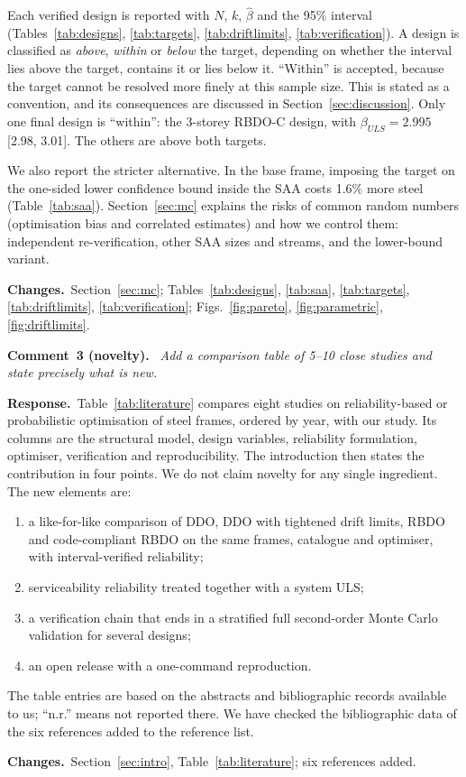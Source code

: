 \documentclass[11pt]{article}
\newcounter{rc}
\newenvironment{comment}[1]{\refstepcounter{rc}\par\medskip\noindent\textbf{Comment~#1.}\ \itshape}{\par}
\newcommand{\resp}{\par\noindent\textbf{Response.}\ }
\newcommand{\chg}{\par\noindent\textbf{Changes.}\ }
\begin{document}
Each verified design is reported with $N$, $k$, $\hat\beta$ and the 95\% interval
(Tables~\ref{tab:designs}, \ref{tab:targets}, \ref{tab:driftlimits}, \ref{tab:verification}). A design is
classified as \emph{above}, \emph{within} or \emph{below} the target, depending on whether the interval
lies above the target, contains it or lies below it. ``Within'' is accepted, because the target cannot
be resolved more finely at this sample size. This is stated as a convention, and its consequences are
discussed in Section~\ref{sec:discussion}. Only one final design is ``within'': the 3-storey RBDO-C
design, with $\beta_{ULS}=2.995$ [2.98, 3.01]. The others are above both targets.

We also report the stricter alternative. In the base frame, imposing the target on the one-sided lower
confidence bound inside the SAA costs 1.6\% more steel (Table~\ref{tab:saa}). Section~\ref{sec:mc}
explains the risks of common random numbers (optimisation bias and correlated estimates) and how we
control them: independent re-verification, other SAA sizes and streams, and the lower-bound variant.
\chg Section~\ref{sec:mc}; Tables~\ref{tab:designs}, \ref{tab:saa}, \ref{tab:targets},
\ref{tab:driftlimits}, \ref{tab:verification}; Figs.~\ref{fig:pareto}, \ref{fig:parametric},
\ref{fig:driftlimits}.

\begin{comment}{3 (novelty)}
Add a comparison table of 5--10 close studies and state precisely what is new.
\end{comment}
\resp Table~\ref{tab:literature} compares eight studies on reliability-based or probabilistic
optimisation of steel frames, ordered by year, with our study. Its columns are the structural model,
design variables, reliability formulation, optimiser, verification and reproducibility. The
introduction then states the contribution in four points. We do not claim novelty for any single
ingredient. The new elements are:
\begin{enumerate}[label=(\roman*),itemsep=0.1em]
\item a like-for-like comparison of DDO, DDO with tightened drift limits, RBDO and code-compliant RBDO
on the same frames, catalogue and optimiser, with interval-verified reliability;
\item serviceability reliability treated together with a system ULS;
\item a verification chain that ends in a stratified full second-order Monte Carlo validation for
several designs;
\item an open release with a one-command reproduction.
\end{enumerate}
The table entries are based on the abstracts and bibliographic records available to us; ``n.r.''
means not reported there. We have checked the bibliographic data of the six references added to the
reference list.
\chg Section~\ref{sec:intro}, Table~\ref{tab:literature}; six references added.
\end{document}
